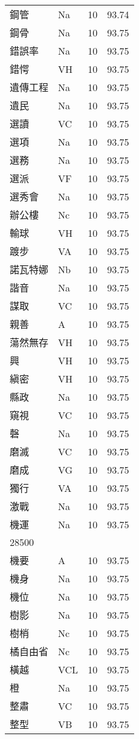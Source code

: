 \documentclass[twocolumn]{book}
\begin{document}
\begin{supertabular}{llrr}
鋼管 & Na & 10 &  93.74\\
鋼骨 & Na & 10 &  93.75\\
錯誤率 & Na & 10 &  93.75\\
錯愕 & VH & 10 &  93.75\\
遺傳工程 & Na & 10 &  93.75\\
遺民 & Na & 10 &  93.75\\
選讀 & VC & 10 &  93.75\\
選項 & Na & 10 &  93.75\\
選務 & Na & 10 &  93.75\\
選派 & VF & 10 &  93.75\\
選秀會 & Na & 10 &  93.75\\
辦公樓 & Nc & 10 &  93.75\\
輸球 & VH & 10 &  93.75\\
踱步 & VA & 10 &  93.75\\
諾瓦特娜 & Nb & 10 &  93.75\\
諧音 & Na & 10 &  93.75\\
謀取 & VC & 10 &  93.75\\
親善 & A & 10 &  93.75\\
蕩然無存 & VH & 10 &  93.75\\
興 & VH & 10 &  93.75\\
縝密 & VH & 10 &  93.75\\
縣政 & Na & 10 &  93.75\\
窺視 & VC & 10 &  93.75\\
磬 & Na & 10 &  93.75\\
磨滅 & VC & 10 &  93.75\\
磨成 & VG & 10 &  93.75\\
獨行 & VA & 10 &  93.75\\
激戰 & Na & 10 &  93.75\\
機運 & Na & 10 &  93.75\\
28500\\
機要 & A & 10 &  93.75\\
機身 & Na & 10 &  93.75\\
機位 & Na & 10 &  93.75\\
樹影 & Na & 10 &  93.75\\
樹梢 & Nc & 10 &  93.75\\
橘自由省 & Nc & 10 &  93.75\\
橫越 & VCL & 10 &  93.75\\
橙 & Na & 10 &  93.75\\
整肅 & VC & 10 &  93.75\\
整型 & VB & 10 &  93.75\\

\end{supertabular}
\end{document}
